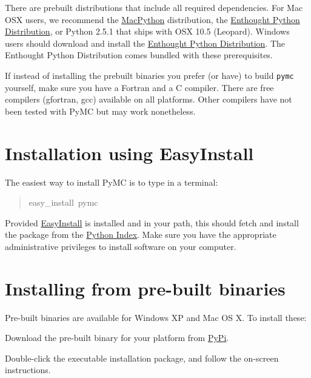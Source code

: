 There are prebuilt distributions that include all required dependencies. For 
Mac OSX users, we recommend the \href{http://www.activestate.com/Products/ActivePython/}{MacPython} distribution, the 
\href{http://www.enthought.com/products/epddownload.php}{Enthought Python Distribution}, or Python 2.5.1 that ships with 
OSX 10.5 (Leopard). Windows users should download and install the 
\href{http://www.enthought.com/products/epddownload.php}{Enthought Python Distribution}. The Enthought Python Distribution comes 
bundled with these prerequisites.

If instead of installing the prebuilt binaries you prefer (or have) to build 
\texttt{pymc} yourself, make sure you have a Fortran and a C compiler. There are free
compilers (gfortran, gcc) available on all platforms. Other compilers have not been
tested with PyMC but may work nonetheless.



\hypertarget{installation-using-easyinstall}{}
\section*{Installation using EasyInstall}

The easiest way to install PyMC is to type in a terminal:
\begin{quote}{\ttfamily \raggedright \noindent
easy{\_}install~pymc
}\end{quote}

Provided \href{http://peak.telecommunity.com/DevCenter/EasyInstall}{EasyInstall} is installed and in your path, this should fetch 
and install the package from the \href{http://pypi.python.org/pypi}{Python Index}. Make sure
you have the appropriate administrative privileges to install software on 
your computer.



\hypertarget{installing-from-pre-built-binaries}{}
\section*{Installing from pre-built binaries}

Pre-built binaries are available for Windows XP and Mac OS X. To install these:
\begin{list}{.}
{
\setlength{\rightmargin}{\leftmargin}
}
\item {} 
Download the pre-built binary for your platform from \href{http://pypi.python.org/pypi/pymc/}{PyPi}.

\item {} 
Double-click the executable installation package, and follow the on-screen 
instructions.

\end{list}

